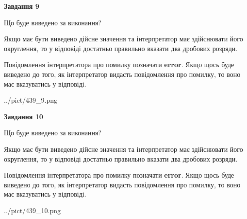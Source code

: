 \documentclass[12pt, ukrainian]{article}
\begin{document}
{\begin {Large}
{\begin {center}\textbf{Завдання 9}\end {center}}\par
Що буде виведено за виконання? \par

Якщо має бути виведено дійсне значення та інтерпретатор має здійснювати його округлення, 
то у відповіді достатньо правильно вказати два дробових розряди.

Повідомлення інтерпретатора про помилку позначати \textbf{error}.
Якщо щось буде виведено до того, як інтерпретатор видасть повідомлення про помилку, 
то воно має вказуватись у відповіді. \par

\begin{center}
	{../pict/439_9.png}
\end{center}
\newpage

{\begin {center}\textbf{Завдання 10}\end {center}}\par
Що буде виведено за виконання? \par

Якщо має бути виведено дійсне значення та інтерпретатор має здійснювати його округлення, 
то у відповіді достатньо правильно вказати два дробових розряди.

Повідомлення інтерпретатора про помилку позначати \textbf{error}.
Якщо щось буде виведено до того, як інтерпретатор видасть повідомлення про помилку, 
то воно має вказуватись у відповіді. \par

\begin{center}
	{../pict/439_10.png}
\end{center}
\newpage

\end {Large}}
\end{document}
